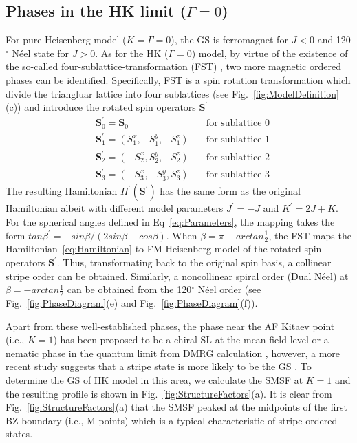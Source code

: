 \documentclass[aps,prb,reprint,amsfonts,amsmath,amssymb,showpacs,groupedaddress,superscriptaddress]{revtex4-1}
\begin{document}
\subsection{\label{subsec:HKLimit}Phases in the HK limit ($\Gamma=0$)}
For pure Heisenberg model ($K=\Gamma=0$), the GS is ferromagnet for $J<0$ and 120$^\circ$ N\'{e}el state for $J>0$. As for the HK ($\Gamma=0$) model, by virtue of the existence of the so-called four-sublattice-transformation (FST) \cite{PhysRevB.89.014414}, two more magnetic ordered phases can be identified. Specifically, FST is a spin rotation transformation which divide the triangluar lattice into four sublattices (see Fig.~\ref{fig:ModelDefinition}(c)) and introduce the rotated spin operators $\bm{S}^{'}$
\begin{align*}
    & \bm{S}_{0}^{'} = \bm{S}_{0}& \quad \text{for sublattice 0} \\
    & \bm{S}_{1}^{'} = (S_1^x, -S_1^y, -S_1^z)& \quad \text{for sublattice 1} \\
    & \bm{S}_{2}^{'} = (-S_2^x, S_2^y, -S_2^z)& \quad \text{for sublattice 2} \\
    & \bm{S}_{3}^{'} = (-S_3^x, -S_3^y, S_3^z)& \quad \text{for sublattice 3}
\end{align*}
The resulting Hamiltonian $H^{'}(\bm{S}^{'})$ has the same form as the original Hamiltonian albeit with different model parameters $J^{'} = -J$ and $K^{'} = 2J + K$. For the spherical angles defined in Eq~\eqref{eq:Parameters}, the mapping takes the form $tan\beta^{'}=-sin\beta/(2sin\beta + cos\beta)$. When $\beta=\pi - arctan\frac{1}{2}$, the FST maps the Hamiltonian~\eqref{eq:Hamiltonian} to FM Heisenberg model of the rotated spin operators $\bm{S}^{'}$. Thus, transformating back to the original spin basis, a collinear stripe order can be obtained. Similarly, a noncollinear spiral order (Dual N\'{e}el) at $\beta=-arctan\frac{1}{2}$ can be obtained from the 120$^\circ$ N\'{e}el order (see Fig.~\ref{fig:PhaseDiagram}(e) and Fig.~\ref{fig:PhaseDiagram}(f)).

Apart from these well-established phases, the phase near the AF Kitaev point (i.e., $K=1$) has been proposed to be a chiral SL at the mean field level \cite{KaiLi2015} or a nematic phase in the quantum limit from DMRG calculation \cite{PhysRevB.91.155135}, however, a more recent study suggests that a stripe state is more likely to be the GS \cite{PhysRevX.9.021017}. To determine the GS of HK model in this area, we calculate the SMSF at $K=1$ and the resulting profile is shown in Fig.~\ref{fig:StructureFactors}(a). It is clear from Fig.~\ref{fig:StructureFactors}(a) that the SMSF peaked at the midpoints of the first BZ boundary (i.e., M-points) which is a typical characteristic of stripe ordered states.
\end{document}
